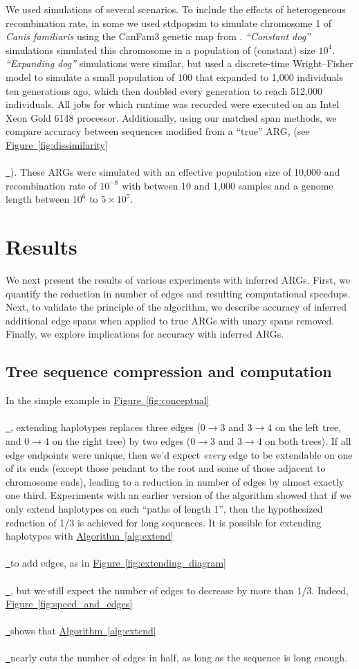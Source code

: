 \documentclass[10pt,twoside,lineno]{gsajnl}
\newcommand{\algorithmref}[2][]{%
	\hyperref[{#2}]{%
		Algorithm~\ref*{#2}%
		\ifx\\#1\\%
		\else
		\,#1%
		\fi
	}%
}
\newcommand*{\figref}[2][]{%
	\hyperref[{#2}]{%
		Figure~\ref*{#2}%
		\ifx\\#1\\%
		\else
		\,#1%
		\fi
	}%
}
\begin{document}
We used simulations of several scenarios.
To include the effects of heterogeneous recombination rate,
in some we used stdpopsim \citep{adrion2020stdpopsim} 
to simulate chromosome 1 of \textit{Canis familiaris}
using the CanFam3 genetic map from \citet{campbell2016}.
\emph{``Constant dog''} simulations simulated this chromosome in a 
population of (constant) size $10^4$.
\emph{``Expanding dog''} simulations were similar, but
used a discrete-time Wright--Fisher model to simulate
a small population of 100 that expanded to 1,000 individuals ten generations ago,
which then doubled every generation to reach 512,000 individuals.
All jobs for which runtime was recorded were executed on an Intel Xeon Gold 6148 processor.
Additionally, using our matched span methods, we compare accuracy between sequences modified from a ``true'' ARG,
(see \figref{fig:dissimilarity}).  
These ARGs were simulated with an effective population size of 10,000
and recombination rate of $10^{-8}$ with between 10 and 1,000 samples
and a genome length between $10^6$ to $5\times 10^7$.


\section{Results}

We next present the results of various experiments with inferred ARGs. 
First, we quantify the reduction in number of edges and resulting computational speedups.
Next, to validate the principle of the algorithm,
we describe accuracy of inferred additional edge spans when applied to true ARGs with unary spans removed.
Finally, we explore implications for accuracy with inferred ARGs.


\subsection{Tree sequence compression and computation}


In the simple example in \figref{fig:conceptual},
extending haplotypes replaces three edges
($0 \to 3$ and $3 \to 4$ on the left tree, and $0 \to 4$ on the right tree)
by two edges ($0 \to 3$ and $3 \to 4$ on both trees).
If all edge endpoints were unique, then we'd expect \emph{every} edge to be extendable
on one of its ends
(except those pendant to the root and some of those adjacent to chromosome ends),
leading to a reduction in number of edges by almost exactly one third.
Experiments with an earlier version of the algorithm showed that
if we only extend haplotypes on such ``paths of length 1'', 
then the hypothesized reduction of 1/3 is achieved for long sequences.
It is possible for extending haplotypes with \algorithmref{alg:extend} to add edges, as in \figref{fig:extending_diagram},
but we still expect the number of edges to decrease by more than 1/3.
Indeed,
\figref{fig:speed_and_edges} shows that \algorithmref{alg:extend} nearly cuts the number of edges
in half, as long as the sequence is long enough.
\end{document}
